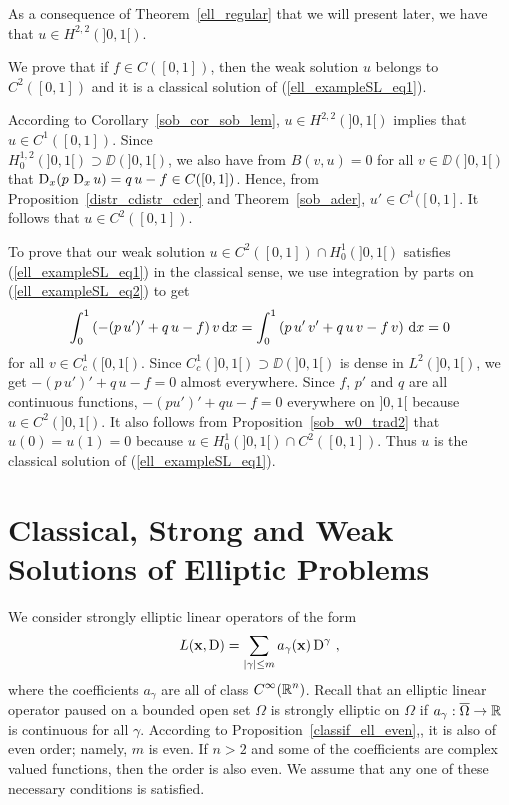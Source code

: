 \begin{egg}
As a consequence of Theorem~\ref{ell_regular} that we will present later,
we have that $\displaystyle u\in H^{2,2}(]0,1[)$.

We prove that if $f \in C([0,1])$, then
the weak solution $u$ belongs to $\displaystyle C^2([0,1])$ and it is
a classical solution of (\ref{ell_exampleSL_eq1}).

According to Corollary~\ref{sob_cor_sob_lem},
$\displaystyle u\in H^{2,2}(]0,1[)$
implies that $\displaystyle u \in C^1([0,1])$.  Since\\
$\displaystyle H^{1,2}_0(]0,1[) \supset \DD(]0,1[)$,
we also have from $B(v,u)=0$ for all $v \in \DD(]0,1[)$ that
$\operatorname{D}_x(p\, \operatorname{D}_x u) = q\,u - f \in C([0,1])$.  Hence, from
Proposition~\ref{distr_cdistr_cder} and Theorem~\ref{sob_ader},
$u'\in C^1([0,1]$.  It follows that $\displaystyle u \in C^2([0,1])$.

To prove that our weak solution
$\displaystyle u \in C^2([0,1]) \cap H^1_0(]0,1[)$
satisfies (\ref{ell_exampleSL_eq1}) in the classical sense, we use
integration by parts on (\ref{ell_exampleSL_eq2}) to get
\[
\int_0^1 \left( -(p\,u')' + q\,u - f\right) v \,\mathrm{d}{x} =
\int_0^1 \left( p\,u'\, v' + q\,u\,v - f\, v\right) \,\mathrm{d}{x} = 0
\]
for all $\displaystyle v \in C^1_c([0,1[)$.
Since $\displaystyle C^1_c(]0,1[)\supset \DD(]0,1[)$ is dense in
$\displaystyle L^2(]0,1[)$, we
get $\displaystyle -(p\,u')' + q\,u - f = 0$ almost
everywhere.  Since $f$, $p'$ and $q$ are all continuous functions,
$\displaystyle -(pu')' + q u -f = 0$ everywhere on $]0,1[$ because
$\displaystyle u\in C^2(]0,1[)$.  It also follows from
Proposition~\ref{sob_w0_trad2} that $u(0)=u(1)=0$ because
$\displaystyle u \in H^1_0(]0,1[)\cap C^2([0,1])$.  Thus $u$ is the classical
solution of (\ref{ell_exampleSL_eq1}). 
\end{egg}

\section[Classical, Strong and Weak Solutions]{Classical, Strong and
Weak Solutions of Elliptic Problems} \label{CSWSsection}

We consider strongly elliptic linear operators of the form
\begin{equation} \label{ell_op1} 
L(\mathbf{x}, \operatorname{D}) = \sum_{|\gamma|\leq m} a_\gamma(\mathbf{x}) \operatorname{D}^\gamma \ ,
\end{equation}
where the coefficients $a_\gamma$ are all of class
$\displaystyle C^\infty(\mathbb{R}^n)$.
Recall that an elliptic linear operator paused
on a bounded open set $\Omega$ is strongly elliptic on $\Omega$ if
$a_\gamma:\overline{\Omega} \to \mathbb{R}$ is continuous for all $\gamma$.
According to Proposition~\ref{classif_ell_even},, it is also of even
order; namely, $m$ is even.  If $n>2$ and some of the coefficients are
complex valued functions, then the order is also even.
We assume that any one of these necessary conditions is satisfied.

